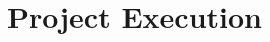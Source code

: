 \documentclass[ %
                    author={Luke Murray},
                supervisor={Dr. Simon Hollis},
                     title={Shadow Peer-to-Peer Networks},
                  subtitle={},
                    degree={MEng},
                      year={2013} ]{thesis}
\begin{document}

\chapter{Project Execution}
\label{chap:execution}

\end{document}
